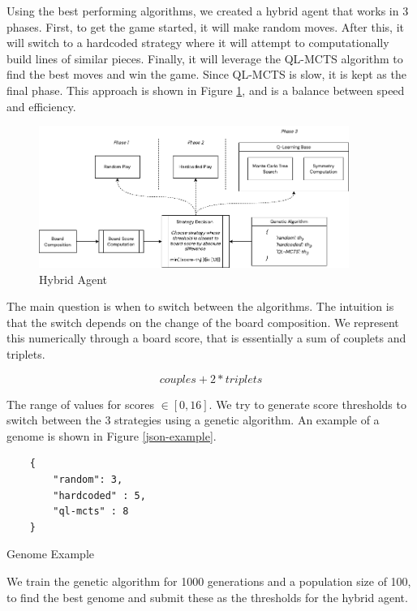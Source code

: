 Using the best performing algorithms, we created a hybrid agent that works in 3 phases. First, to get the game started, it will make random moves. After this, it will switch to a hardcoded strategy where it will attempt to computationally build lines of similar pieces. Finally, it will leverage the QL-MCTS algorithm to find the best moves and win the game. Since QL-MCTS is slow, it is kept as the final phase. This approach is shown in Figure \ref{fig:hybrid-agent}, and is a balance between speed and efficiency.

\begin{figure}
    \centering
    \includegraphics[width=0.9\textwidth]{images/methodology.drawio.png}
    \caption{Hybrid Agent}
    \label{fig:hybrid-agent}
\end{figure}

The main question is when to switch between the algorithms. The intuition is that the switch depends on the change of the board composition. We represent this numerically through a board score, that is essentially a sum of couplets and triplets.

\begin{equation*}
    couples + 2 * triplets
\end{equation*}

The range of values for scores $\in [0, 16]$. We try to generate score thresholds to switch between the 3 strategies using a genetic algorithm. An example of a genome is shown in Figure \ref{json-example}.

\begin{listing}
    \begin{verbatim}
    {
        "random": 3,
        "hardcoded" : 5,
        "ql-mcts" : 8
    }
    \end{verbatim}
    \caption{Genome Example}
    \label{json-example}
    \end{listing}

We train the genetic algorithm for 1000 generations and a population size of 100, to find the best genome and submit these as the thresholds for the hybrid agent.

